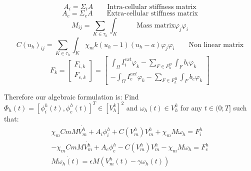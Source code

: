 \documentclass[a4paper,12pt]{article}
\begin{document}
\begin{equation}
A_i=\Sigma_i A \qquad{\text{Intra-cellular stiffness matrix}}
\end{equation}
\begin{equation}
A_e=\Sigma_e A \qquad{\text{Extra-cellular stiffness matrix}}
\end{equation}
\begin{equation}
M_{ij} = \sum_{K \in \tau_h}\int_K \qquad{\text{Mass matrix}}
\varphi_j\varphi_i
\end{equation}
\begin{equation}
C(u_h)_{ij} =  \sum_{K \in \tau_h} \int_K \chi_m k(u_h-1)(u_h-a)\varphi_j\varphi_i \qquad{\text{Non linear matrix}}
\end{equation}
\begin{equation}
F_k=\begin{bmatrix} F_{i,k} \\ F_{e,k} \end{bmatrix}=\begin{bmatrix} \int_{\Omega} I_i^{ext}\varphi_k - \sum_{F \in F_h^B} \int_F b_i\varphi_k \\ - \int_{\Omega} I_e^{ext}\varphi_k - \sum_{F \in F_h^B} \int_F b_e\varphi_k \end{bmatrix}
\end{equation}

Therefore our algebraic formulation is:
\newline
Find $\Phi_h(t)=[\phi_i^h(t),\phi_e^h(t)]^T \in [V_h^k]^2$ and $\omega_h(t) \in V_h^k$ for any $t \in (0;T]$ such that:
\begin{equation}
\begin{gathered}
\chi_m Cm M \dot{V_m^h}+A_i \phi_i^h+C(V_m^h) V_m^h+\chi_m M \omega_h=F_i^h\\
-\chi_m Cm M \dot{V_m^h}+A_e \phi_e^h-C(V_m^h) V_m^h-\chi_m M \omega_h=F_e^h\\
M \dot{\omega_h(t)}=\epsilon M (V_m^h(t)-\gamma \omega_h(t))
\end{gathered}
\end{equation}
 
\end{document}
